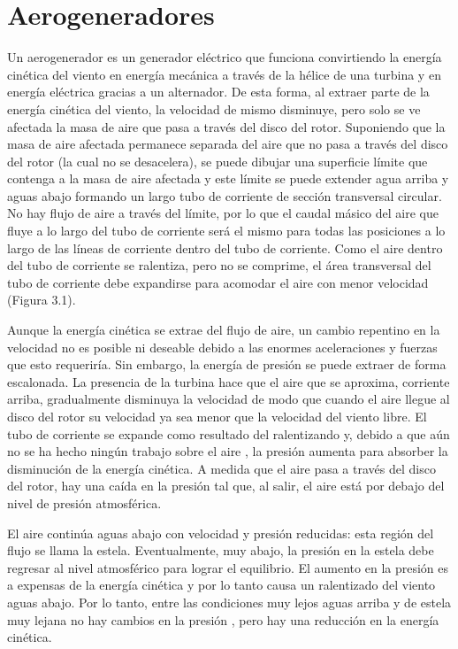 \chapter{Aerogeneradores}


Un aerogenerador es un generador eléctrico que funciona convirtiendo la energía cinética del viento en energía mecánica a través de la hélice de una turbina y en energía eléctrica gracias a un alternador.
De esta forma, al extraer parte de la energía cinética del viento, la velocidad de mismo disminuye, pero solo se ve afectada la masa de aire que pasa a través del disco del rotor. Suponiendo que la masa de aire afectada permanece separada del aire que no pasa a través del disco del rotor (la cual no se desacelera), se puede dibujar una superficie límite que contenga a la masa de aire afectada y este límite se puede extender agua arriba y aguas abajo formando un largo tubo de corriente de sección transversal circular. No hay flujo de aire a través del límite, por lo que el caudal másico del aire que fluye a lo largo del tubo de corriente será el mismo para todas las posiciones a lo largo de las líneas de corriente dentro del tubo de corriente. Como el aire dentro del tubo de corriente se ralentiza, pero no se comprime, el área transversal del tubo de corriente debe expandirse para acomodar el aire con menor velocidad (Figura 3.1).

Aunque la energía cinética se extrae del flujo de aire, un cambio repentino en la velocidad no es posible ni deseable debido a las enormes aceleraciones y fuerzas que esto requeriría. Sin embargo, la energía de presión se puede extraer de forma escalonada. La presencia de la turbina hace que el aire que se aproxima, corriente arriba, gradualmente disminuya la velocidad de modo que cuando el aire llegue al disco del rotor su velocidad ya sea menor que la velocidad del viento libre. El tubo de corriente se expande como resultado del ralentizando y, debido a que aún no se ha hecho ningún trabajo sobre el aire %
, la presión aumenta para absorber la disminución de la energía cinética. A medida que el aire pasa a través del disco del rotor, hay una caída en la presión %
tal que, al salir, el aire está por debajo del nivel de presión atmosférica.

El aire continúa aguas abajo con velocidad y presión %
reducidas: esta región del flujo se llama la estela. Eventualmente, muy abajo, la presión %
en la estela debe regresar al nivel atmosférico para lograr el equilibrio. El aumento en la presión %
es a expensas de la energía cinética y por lo tanto causa un ralentizado del viento aguas abajo. Por lo tanto, entre las condiciones muy lejos aguas arriba y de estela muy lejana no hay cambios en la presión %
, pero hay una reducción en la energía cinética.

